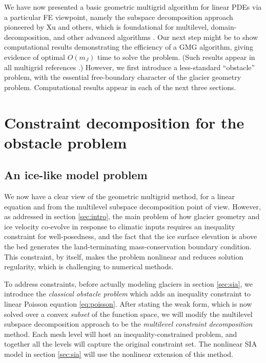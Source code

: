 \documentclass[letterpaper,final,12pt,reqno]{amsart}
\theoremstyle{claim}
\numberwithin{equation}{section}
\numberwithin{figure}{section}
\numberwithin{table}{section}
\numberwithin{theorem}{section}
\begin{document}
We have now presented a basic geometric multigrid algorithm for linear PDEs via a particular FE viewpoint, namely the subspace decomposition approach pioneered by Xu \cite{Xu1992} and others, which is foundational for multilevel, domain-decomposition, and other advanced algorithms \cite[for example]{Farrelletal2019}.  Our next step might be to show computational results demonstrating the efficiency of a GMG algorithm, giving evidence of optimal $O(m_J)$ time to solve the problem.  (Such results appear in all multigrid references \cite{Braess2007,Briggsetal2000,Bueler2021,Elmanetal2014,Trottenbergetal2001}.)  However, we first introduce a less-standard ``obstacle'' problem, with the essential free-boundary character of the glacier geometry problem.  Computational results appear in each of the next three sections.


\section{Constraint decomposition for the obstacle problem} \label{sec:obstacle}

\subsection*{An ice-like model problem}  We now have a clear view of the geometric multigrid method, for a linear equation and from the multilevel subspace decomposition point of view.  However, as addressed in section \ref{sec:intro}, the main problem of how glacier geometry and ice velocity co-evolve in response to climatic inputs requires an inequality constraint for well-posedness, and the fact that the ice surface elevation is above the bed generates the land-terminating mass-conservation boundary condition.  This constraint, by itself, makes the problem nonlinear and reduces solution regularity, which is challenging to numerical methods.

To address constraints, before actually modeling glaciers in section \ref{sec:sia}, we introduce the \emph{classical obstacle problem} which adds an inequality constraint to linear Poisson equation \eqref{eq:poisson}.  After stating the weak form, which is now solved over a convex \emph{subset} of the function space, we will modify the multilevel subspace decomposition approach to be the \emph{multilevel constraint decomposition} method.  Each mesh level will host an inequality-constrained problem, and together all the levels will capture the original constraint set.  The nonlinear SIA model in section \ref{sec:sia} will use the nonlinear extension of this method.
\end{document}
